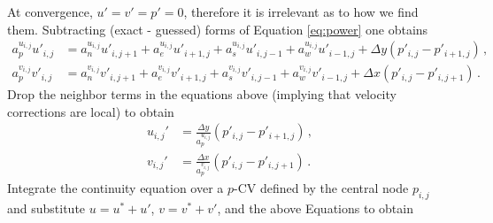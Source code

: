 \documentclass{article}
\begin{document}
At convergence, $u' = v' = p' = 0$, therefore it is irrelevant as to how we find them. Subtracting (exact - guessed) forms of Equation \eqref{eq:power} one obtains
\begin{subequations}
	\begin{align}
	a^{u_{i,j}}_p u'_{i,j} & = a^{u_{i,j}}_n u'_{i, j+1} + a^{u_{i,j}}_e u'_{i+1, j} + a^{u_{i,j}}_s u'_{i, j-1} + a^{u_{i,j}}_w u'_{i-1, j} + \Delta y (p'_{i,j} - p'_{i+1,j}) \,, \\
	a^{v_{i,j}}_p v'_{i,j} & = a^{v_{i,j}}_n v'_{i, j+1} + a^{v_{i,j}}_e v'_{i+1, j} + a^{v_{i,j}}_s v'_{i, j-1} + a^{v_{i,j}}_w v'_{i-1, j} + \Delta x (p'_{i,j} - p'_{i, j+1}) \,.
	\end{align}
\end{subequations}
Drop the neighbor terms in the equations above (implying that velocity corrections are local) to obtain
\begin{subequations}
	\label{eq:velocity_corrector}
	\begin{align}
	u_{i,j}' & = \frac{\Delta y}{a_p^{u_{i,j}}} (p'_{i,j} - p'_{i+1,j})\,, \\
	v_{i,j}' & = \frac{\Delta x}{a_p^{v_{i,j}}} (p'_{i,j} - p'_{i, j+1})\,.
	\end{align}
\end{subequations}
Integrate the continuity equation over a $p$-CV defined by the central node $p_{i,j}$ and substitute $u = u^* + u'$, $v = v^* + v'$, and the above Equations to obtain
\end{document}
